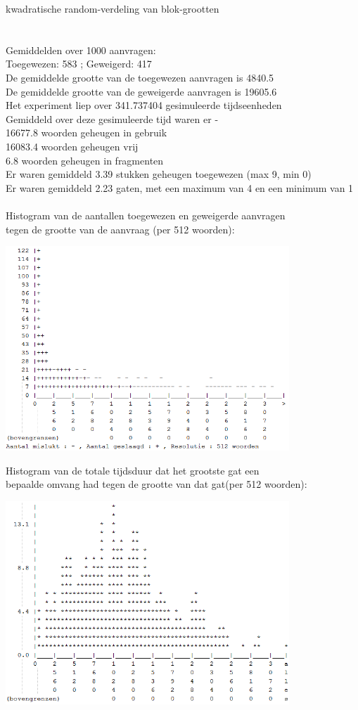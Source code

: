 \documentclass[a4paper]{article}
\begin{document}
kwadratische random-verdeling van blok-grootten\\
\\
\\
Gemiddelden over 1000 aanvragen:\\
Toegewezen: 583 ; Geweigerd: 417\\
De gemiddelde grootte van de toegewezen aanvragen is 4840.5\\
De gemiddelde grootte van de geweigerde aanvragen is 19605.6\\
Het experiment liep over 341.737404 gesimuleerde tijdseenheden\\
Gemiddeld over deze gesimuleerde tijd waren er - \\
 16677.8 woorden geheugen in gebruik\\
 16083.4 woorden geheugen vrij\\
     6.8 woorden geheugen in fragmenten\\
Er waren gemiddeld     3.39 stukken geheugen toegewezen (max 9, min 0)\\
Er waren gemiddeld     2.23 gaten, met een maximum van 4 en een minimum van 1\\
\\
Histogram van de aantallen toegewezen en geweigerde aanvragen\\
tegen de grootte van de aanvraag (per 512 woorden):
\begin{center}
\includegraphics[width=0.8\textwidth]{wf5.png}
\end{center}
Histogram van de totale tijdsduur dat het grootste gat een\\
bepaalde omvang had tegen de grootte van dat gat(per 512 woorden):
\begin{center}
\includegraphics[width=0.8\textwidth]{wf6.png}
\end{center}
\end{document}
